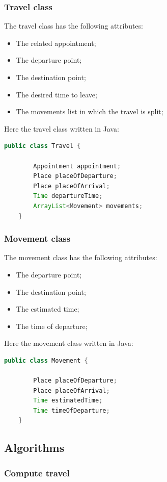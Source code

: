 \subsubsection{Travel class}

The travel class has the following attributes:
\begin{itemize}
	\item The related appointment;
	\item The departure point;
	\item The destination point;
	\item The desired time to leave;
	\item The movements list in which the travel is split;
\end{itemize}

Here the travel class written in Java:
\begin{lstlisting}[language=Java]
	public class Travel {
	
		Appointment appointment;
		Place placeOfDeparture;
		Place placeOfArrival;
		Time departureTime;
		ArrayList<Movement> movements;
	}
\end{lstlisting}

\subsubsection{Movement class}

The movement class has the following attributes:
\begin{itemize}
	\item The departure point;
	\item The destination point;
	\item The estimated time;
	\item The time of departure;
\end{itemize}

Here the movement class written in Java:
\begin{lstlisting}[language=Java]
	public class Movement {
		
		Place placeOfDeparture;
		Place placeOfArrival;
		Time estimatedTime;
		Time timeOfDeparture;
	}
\end{lstlisting}

\subsection{Algorithms}
\subsubsection{Compute travel}


